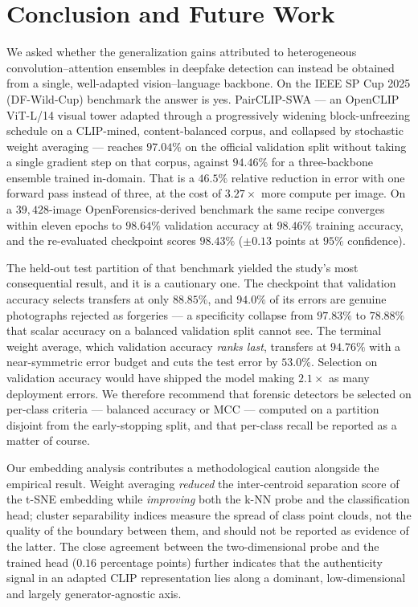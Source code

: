 \documentclass[10pt,journal]{IEEEtran}
\begin{document}
\section{Conclusion and Future Work}\label{sec:conclusion}
We asked whether the generalization gains attributed to heterogeneous
convolution--attention ensembles in deepfake detection can instead be obtained
from a single, well-adapted vision--language backbone. On the IEEE SP Cup 2025
(DF-Wild-Cup) benchmark the answer is yes. PairCLIP-SWA --- an OpenCLIP
ViT-L/14 visual tower adapted through a progressively widening block-unfreezing
schedule on a CLIP-mined, content-balanced corpus, and collapsed by stochastic
weight averaging --- reaches $97.04\%$ on the official validation split without
taking a single gradient step on that corpus, against $94.46\%$ for a
three-backbone ensemble trained in-domain. That is a $46.5\%$ relative
reduction in error with one forward pass instead of three, at the cost of
$3.27\times$ more compute per image. On a $39{,}428$-image
OpenForensics-derived benchmark the same recipe converges within eleven epochs
to $98.64\%$ validation accuracy at $98.46\%$ training accuracy, and the
re-evaluated checkpoint scores $98.43\%$ ($\pm0.13$ points at $95\%$
confidence).

The held-out test partition of that benchmark yielded the study's most
consequential result, and it is a cautionary one. The checkpoint that
validation accuracy selects transfers at only $88.85\%$, and $94.0\%$ of its
errors are genuine photographs rejected as forgeries --- a specificity collapse
from $97.83\%$ to $78.88\%$ that scalar accuracy on a balanced validation split
cannot see. The terminal weight average, which validation accuracy \emph{ranks
last}, transfers at $94.76\%$ with a near-symmetric error budget and cuts the
test error by $53.0\%$. Selection on validation accuracy would have shipped the
model making $2.1\times$ as many deployment errors. We therefore recommend that
forensic detectors be selected on per-class criteria --- balanced accuracy or
MCC --- computed on a partition disjoint from the early-stopping split, and that
per-class recall be reported as a matter of course.

Our embedding analysis contributes a methodological caution alongside the
empirical result. Weight averaging \emph{reduced} the inter-centroid
separation score of the t-SNE embedding while \emph{improving} both the k-NN
probe and the classification head; cluster separability indices measure the
spread of class point clouds, not the quality of the boundary between them,
and should not be reported as evidence of the latter. The close agreement
between the two-dimensional probe and the trained head ($0.16$ percentage
points) further indicates that the authenticity signal in an adapted CLIP
representation lies along a dominant, low-dimensional and largely
generator-agnostic axis.
\end{document}
